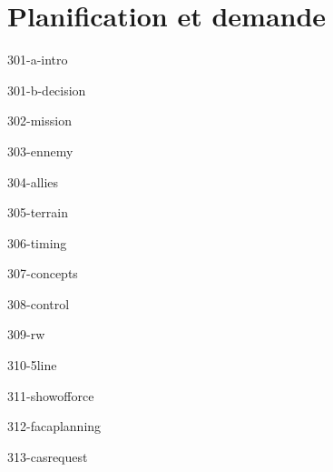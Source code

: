 \chapter{Planification et demande}

\begin{center}
\end{center}

{301-a-intro}

{301-b-decision}

{302-mission}

{303-ennemy}

{304-allies}

{305-terrain}

{306-timing}

{307-concepts}

{308-control}

{309-rw}

{310-5line}

{311-showofforce}

{312-facaplanning}

{313-casrequest}


